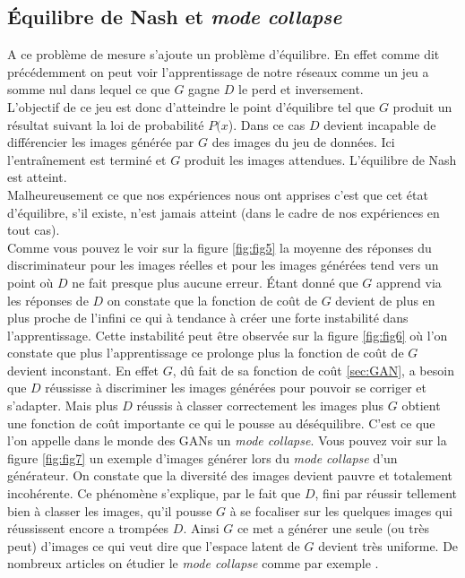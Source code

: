 \documentclass[11pt,francais]{article}
\begin{document}
\subsection{Équilibre de Nash et \textit{mode collapse}}
\label{sec:Nash_Collapse}
A ce problème de mesure s'ajoute un problème d'équilibre. 
En effet comme dit précédemment on peut voir l'apprentissage de notre réseaux comme un jeu a somme nul dans lequel ce que \(G\) gagne \(D\) le perd et inversement.\\
L'objectif de ce jeu est donc d'atteindre le point d'équilibre tel que \(G\) produit un résultat suivant la loi de probabilité \(P(x\)). Dans ce cas \(D\) devient incapable de différencier les images générée par \(G\) des images du jeu de données. Ici l'entraînement est terminé et \(G\) produit les images attendues. L'équilibre de Nash est atteint.\\
Malheureusement ce que nos expériences nous ont apprises c'est que cet état d'équilibre, s'il existe, n'est jamais atteint (dans le cadre de nos expériences en tout cas).\\
Comme vous pouvez le voir sur la figure \ref{fig:fig5} la moyenne des réponses du discriminateur pour les images réelles et pour les images générées tend vers un point où \(D\) ne fait presque plus aucune erreur. Étant donné que \(G\) apprend via les réponses de \(D\) on constate que la fonction de coût de \(G\) devient de plus en plus proche de l'infini ce qui à tendance à créer une forte instabilité dans l'apprentissage. Cette instabilité peut être observée sur la figure \ref{fig:fig6} où l'on constate que plus l'apprentissage ce prolonge plus la fonction de coût de \(G\) devient inconstant.
En effet \(G\), dû fait de sa fonction de coût \ref{sec:GAN}, a besoin que \(D\) réussisse à discriminer les images générées pour pouvoir se corriger et s'adapter. Mais plus \(D\) réussis à classer correctement les images plus \(G\) obtient une fonction de coût importante ce qui le pousse au déséquilibre. C'est ce que l'on appelle dans le monde des GANs un \textit{mode collapse}. Vous pouvez voir sur la figure \ref{fig:fig7} un exemple d'images générer lors du \textit{mode collapse} d'un générateur. On constate que la diversité des images devient pauvre et totalement incohérente. Ce phénomène s'explique, par le fait que \(D\), fini par réussir tellement bien à classer les images, qu'il pousse \(G\) à se focaliser sur les quelques images qui réussissent encore a trompées \(D\). Ainsi \(G\) ce met a générer une seule (ou très peut) d'images ce qui veut dire que l'espace latent de \(G\) devient très uniforme. De nombreux articles on étudier le \textit{mode collapse} comme par exemple \cite{NIPS2014_5423}.\\
\end{document}
